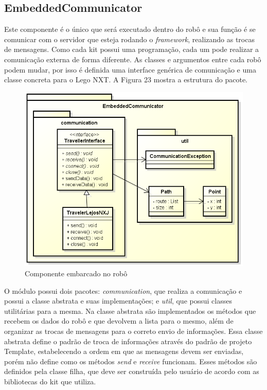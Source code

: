\subsection{EmbeddedCommunicator}

Este componente é o único que será executado dentro do robô e sua função é se comunicar com o servidor que esteja rodando o \textit{framework}, realizando as trocas de mensagens. Como cada kit possui uma programação, cada um pode realizar a comunicação externa de forma diferente. As classes e argumentos entre cada robô podem mudar, por isso é definida uma interface genérica de comunicação e uma classe concreta para o Lego NXT. A Figura 23 mostra a estrutura do pacote.

\begin{figure}[h]
	\centering
	\label{fig23}
		\includegraphics[keepaspectratio=true,scale=0.5]{figuras/embedded.png}
	\caption{Componente embarcado no robô}
\end{figure}

O módulo possui dois pacotes: \textit{communication}, que realiza a comunicação e possui a classe abstrata e suas implementações; e \textit{util}, que possui classes utilitárias para a mesma. Na classe abstrata são implementados os métodos que recebem os dados do robô e que devolvem a lista para o mesmo, além de organizar as trocas de mensagens para o correto envio de informações. Essa classe abstrata define o padrão de troca de informações através do padrão de projeto Template, estabelecendo a ordem em que as mensagens devem ser enviadas, porém não define como os métodos \textit{send} e \textit{receive} funcionam. Esses métodos são definidos pela classe filha, que deve ser construída pelo usuário de acordo com as bibliotecas do kit que utiliza.

